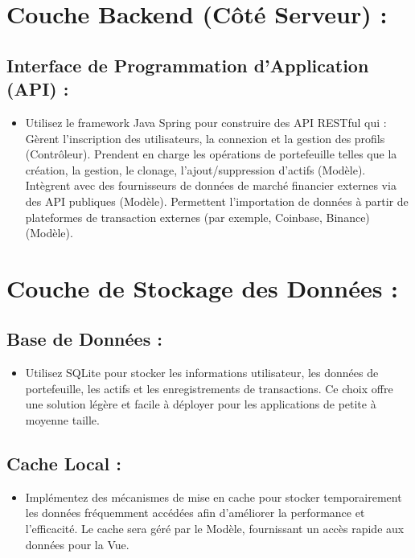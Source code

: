 \documentclass{article}
\begin{document}
\section{Couche Backend (Côté Serveur) :}
\subsection{Interface de Programmation d'Application (API) :}
\begin{itemize}
  \item Utilisez le framework Java Spring pour construire des API RESTful qui :
  \subitem Gèrent l'inscription des utilisateurs, la connexion et la gestion des profils (Contrôleur).
  \subitem Prendent en charge les opérations de portefeuille telles que la création, la gestion, le clonage, l'ajout/suppression d'actifs (Modèle).
  \subitem Intègrent avec des fournisseurs de données de marché financier externes via des API publiques (Modèle).
  \subitem Permettent l'importation de données à partir de plateformes de transaction externes (par exemple, Coinbase, Binance) (Modèle).
\end{itemize}

\section{Couche de Stockage des Données :}
\subsection{Base de Données : }
\begin{itemize}
  \item Utilisez SQLite pour stocker les informations utilisateur, les données de portefeuille, les actifs et les enregistrements de transactions. Ce choix offre une solution légère et facile à déployer pour les applications de petite à moyenne taille.
\end{itemize}
\subsection{Cache Local :}
\begin{itemize}
  \item Implémentez des mécanismes de mise en cache pour stocker temporairement les données fréquemment accédées afin d'améliorer la performance et l'efficacité. Le cache sera géré par le Modèle, fournissant un accès rapide aux données pour la Vue.
\end{itemize}
\end{document}

